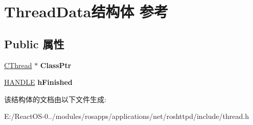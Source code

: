 \hypertarget{struct_thread_data}{}\section{Thread\+Data结构体 参考}
\label{struct_thread_data}
\subsection*{Public 属性}
\begin{DoxyCompactItemize}
\item 
\mbox{\label{struct_thread_data_a916360de51219df6d81c9777ddcd5ea1}} 
\hyperlink{class_c_thread}{C\+Thread} $\ast$ {\bfseries Class\+Ptr}
\item 
\mbox{\label{struct_thread_data_a40b68acfb4f57b432dc617bcbb4792c6}} 
\hyperlink{interfacevoid}{H\+A\+N\+D\+LE} {\bfseries h\+Finished}
\end{DoxyCompactItemize}


该结构体的文档由以下文件生成\+:\begin{DoxyCompactItemize}
\item 
E\+:/\+React\+O\+S-\/0../modules/rosapps/applications/net/roshttpd/include/thread.\+h\end{DoxyCompactItemize}
